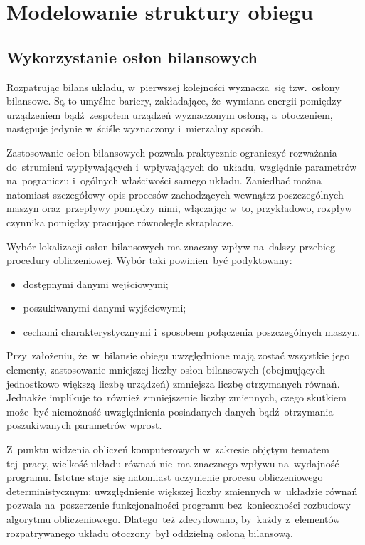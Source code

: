 \section{Modelowanie struktury obiegu}

\subsection{Wykorzystanie osłon bilansowych}

Rozpatrując bilans układu, w~pierwszej kolejności wyznacza~się
tzw.~osłony bilansowe. Są to umyślne bariery, zakładające, że~wymiana
energii pomiędzy urządzeniem bądź~zespołem urządzeń wyznaczonym osłoną,
a~otoczeniem, następuje jedynie w~ściśle wyznaczony i~mierzalny sposób.

Zastosowanie osłon bilansowych pozwala praktycznie ograniczyć rozważania
do~strumieni wypływających i~wpływających do~układu, względnie
parametrów na~pograniczu i~ogólnych właściwości samego układu. Zaniedbać
można natomiast szczegółowy opis procesów zachodzących wewnątrz
poszczególnych maszyn oraz~przepływy pomiędzy nimi, włączając w~to,
przykładowo, rozpływ czynnika pomiędzy pracujące równolegle skraplacze.

Wybór lokalizacji osłon bilansowych ma znaczny wpływ na~dalszy przebieg
procedury obliczeniowej. Wybór taki powinien~być podyktowany:

\begin{itemize}

\item dostępnymi danymi wejściowymi;

\item poszukiwanymi danymi wyjściowymi;

\item cechami charakterystycznymi i~sposobem połączenia poszczególnych
	maszyn.

\end{itemize}

Przy~założeniu, że~w~bilansie obiegu uwzględnione mają zostać wszystkie
jego elementy, zastosowanie mniejszej liczby osłon bilansowych
(obejmujących jednostkowo większą liczbę urządzeń) zmniejsza liczbę
otrzymanych równań. Jednakże implikuje to~również zmniejszenie liczby
zmiennych, czego skutkiem może~być niemożność uwzględnienia posiadanych
danych bądź~otrzymania poszukiwanych parametrów wprost.

Z~punktu widzenia obliczeń komputerowych w~zakresie objętym tematem
tej~pracy, wielkość układu równań nie~ma znacznego wpływu na~wydajność
programu. Istotne staje~się natomiast uczynienie procesu obliczeniowego
deterministycznym; uwzględnienie większej liczby zmiennych w~układzie
równań pozwala na~poszerzenie funkcjonalności programu bez~konieczności
rozbudowy algorytmu obliczeniowego. Dlatego~też zdecydowano, by~każdy
z~elementów rozpatrywanego układu otoczony~był oddzielną osłoną
bilansową.


